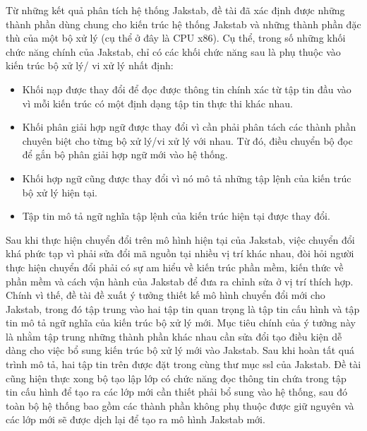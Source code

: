 	Từ những kết quả phân tích hệ thống Jakstab, đề tài đã xác định được những thành phần dùng chung cho kiến trúc hệ thống Jakstab và những thành phần đặc thù của một bộ xử lý (cụ thể ở đây là CPU x86). Cụ thể, trong số những khối chức năng chính của Jakstab, chỉ có các khối chức năng sau là phụ thuộc vào kiến trúc bộ xử lý/ vi xử lý nhất định:
	\begin{itemize}
		\item Khối nạp được thay đổi để đọc được thông tin chính xác từ tập tin đầu vào vì mỗi kiến trúc có một định dạng tập tin thực thi khác nhau.
		\item Khối phân giải hợp ngữ được thay đổi vì cần phải phân tách các thành phần chuyên biệt cho từng bộ xử lý/vi xử lý với nhau. Từ đó, điều chuyển bộ đọc để gắn bộ phân giải hợp ngữ mới vào hệ thống.
		\item Khối hợp ngữ cũng được thay đổi vì nó mô tả những tập lệnh của kiến trúc bộ xử lý hiện tại.
		\item Tập tin mô tả ngữ nghĩa tập lệnh của kiến trúc hiện tại được thay đổi.
	\end{itemize}

	Sau khi thực hiện chuyển đổi trên mô hình hiện tại của Jakstab, việc chuyển đổi khá phức tạp vì phải sửa đổi mã nguồn tại nhiều vị trí khác nhau, đòi hỏi người thực hiện chuyển đổi phải có sự am hiểu về kiến trúc phần mềm, kiến thức về phần mềm và cách vận hành của Jakstab để đưa ra chỉnh sửa ở vị trí thích hợp. Chính vì thế, đề tài đề xuất ý tưởng thiết kế mô hình chuyển đổi mới cho Jakstab, trong đó tập trung vào hai tập tin quan trọng là tập tin cấu hình và tập tin mô tả ngữ nghĩa của kiến trúc bộ xử lý mới. Mục tiêu chính của ý tưởng này là nhằm tập trung những thành phần khác nhau cần sửa đổi tạo điều kiện dễ dàng cho việc bổ sung kiến trúc bộ xử lý mới vào Jakstab. Sau khi hoàn tất quá trình mô tả, hai tập tin trên được đặt trong cùng thư mục ssl của Jakstab. Đề tài cũng hiện thực xong bộ tạo lập lớp có chức năng đọc thông tin chứa trong tập tin cấu hình để tạo ra các lớp mới cần thiết phải bổ sung vào hệ thống, sau đó toàn bộ hệ thống bao gồm các thành phần không phụ thuộc được giữ nguyên và các lớp mới sẽ được dịch lại để tạo ra mô hình Jakstab mới.

